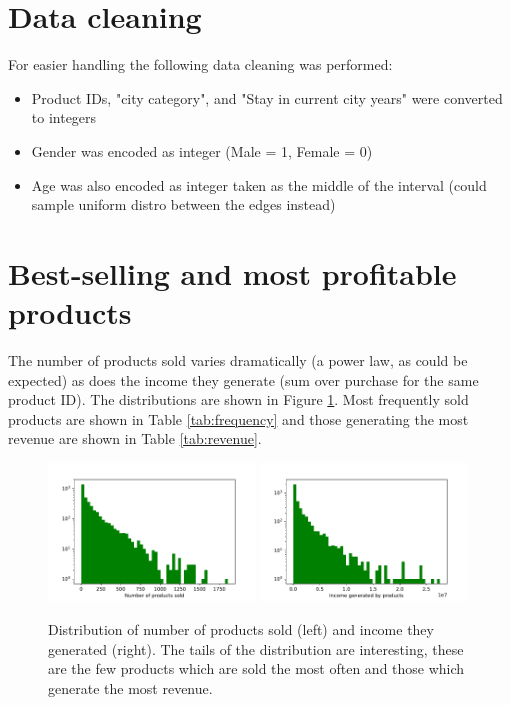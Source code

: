 \documentclass{article}
\begin{document}
\section{Data cleaning}

For easier handling the following data cleaning was performed:
\begin{itemize}
\item Product IDs,  "city category", and "Stay in current city years" were converted to integers
\item Gender was encoded as integer (Male = 1, Female = 0)
\item Age was also encoded as integer taken as the middle of the interval (could sample uniform distro between the edges instead)
\end{itemize}

\section{Best-selling and most profitable products}

The number of products sold varies dramatically (a power law, as could be expected) as does the income they generate (sum over purchase for the same product ID). The distributions are shown in Figure \ref{fig:profit}. Most frequently sold products are shown in Table \ref{tab:frequency} and those generating the most revenue are shown in Table \ref{tab:revenue}.

\begin{figure}[h]
  \begin{center}
      \includegraphics[width=0.49\textwidth]{plots/products_Numberofproductssold.pdf}
    \includegraphics[width=0.49\textwidth]{plots/products_Incomegeneratedbyproducts.pdf}
  \end{center}
  \caption{Distribution of number of products sold (left) and income they generated (right). The tails of the distribution are interesting, these are the few products which are sold the most often and those which generate the most revenue.}
  \label{fig:profit}
\end{figure}
\end{document}
